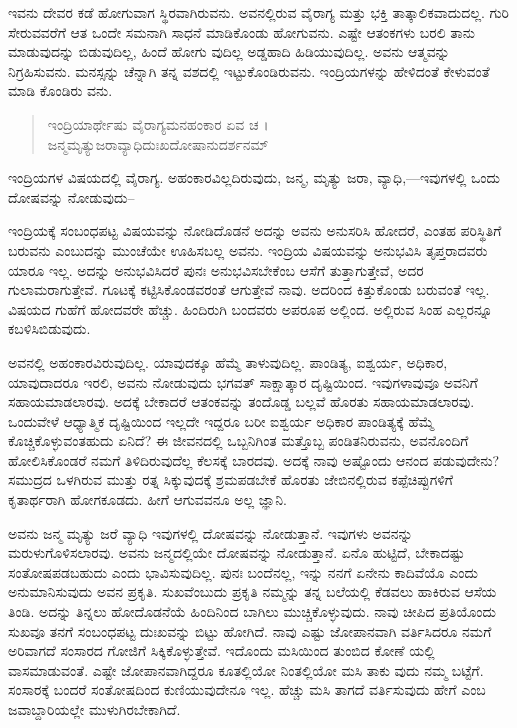 ಇವನು ದೇವರ ಕಡೆ ಹೋಗುವಾಗ ಸ್ಥಿರವಾಗಿರುವನು. ಅವನಲ್ಲಿರುವ ವೈರಾಗ್ಯ ಮತ್ತು ಭಕ್ತಿ ತಾತ್ಕಾಲಿಕವಾದುದಲ್ಲ. ಗುರಿ ಸೇರುವವರೆಗೆ ಆತ ಒಂದೇ ಸಮನಾಗಿ ಸಾಧನೆ ಮಾಡಿಕೊಂಡು ಹೋಗುವನು. ಎಷ್ಟೇ ಆತಂಕಗಳು ಬರಲಿ ತಾನು ಮಾಡುವುದನ್ನು ಬಿಡುವುದಿಲ್ಲ, ಹಿಂದೆ ಹೋಗು ವುದಿಲ್ಲ ಅಡ್ಡಹಾದಿ ಹಿಡಿಯುವುದಿಲ್ಲ. ಅವನು ಆತ್ಮವನ್ನು ನಿಗ್ರಹಿಸುವನು. ಮನಸ್ಸನ್ನು ಚೆನ್ನಾಗಿ ತನ್ನ ವಶದಲ್ಲಿ ಇಟ್ಟುಕೊಂಡಿರುವನು. ಇಂದ್ರಿಯಗಳನ್ನು ಹೇಳಿದಂತೆ ಕೇಳುವಂತೆ ಮಾಡಿ ಕೊಂಡಿರು ವನು.

\begin{verse}
ಇಂದ್ರಿಯಾರ್ಥೇಷು ವೈರಾಗ್ಯಮನಹಂಕಾರ ಏವ ಚ ।\\ಜನ್ಮಮೃತ್ಯುಜರಾವ್ಯಾಧಿದುಃಖದೋಷಾನುದರ್ಶನಮ್ 
\end{verse}

{\small ಇಂದ್ರಿಯಗಳ ವಿಷಯದಲ್ಲಿ ವೈರಾಗ್ಯ. ಅಹಂಕಾರವಿಲ್ಲದಿರುವುದು, ಜನ್ಮ, ಮೃತ್ಯು ಜರಾ, ವ್ಯಾಧಿ,—ಇವುಗಳಲ್ಲಿ ಒಂದು ದೋಷವನ್ನು ನೋಡುವುದು–}

ಇಂದ್ರಿಯಕ್ಕೆ ಸಂಬಂಧಪಟ್ಟ ವಿಷಯವನ್ನು ನೋಡಿದೊಡನೆ ಅದನ್ನು ಅವನು ಅನುಸರಿಸಿ ಹೋದರೆ, ಎಂತಹ ಪರಿಸ್ಥಿತಿಗೆ ಬರುವನು ಎಂಬುದನ್ನು ಮುಂಚೆಯೇ ಊಹಿಸಬಲ್ಲ ಅವನು. ಇಂದ್ರಿಯ ವಿಷಯವನ್ನು ಅನುಭವಿಸಿ ತೃಪ್ತರಾದವರು ಯಾರೂ ಇಲ್ಲ. ಅದನ್ನು ಅನುಭವಿಸಿದರೆ ಪುನಃ ಅನುಭವಿಸಬೇಕೆಂಬ ಆಸೆಗೆ ತುತ್ತಾಗುತ್ತೇವೆ, ಅದರ ಗುಲಾಮರಾಗುತ್ತೇವೆ. ಗೂಟಕ್ಕೆ ಕಟ್ಟಿಸಿಕೊಂಡವರಂತೆ ಆಗುತ್ತೇವೆ ನಾವು. ಅದರಿಂದ ಕಿತ್ತುಕೊಂಡು ಬರುವಂತೆ ಇಲ್ಲ. ವಿಷಯದ ಗುಹೆಗೆ ಹೋದವರೇ ಹೆಚ್ಚು. ಹಿಂದಿರುಗಿ ಬಂದವರು ಅಪರೂಪ ಅಲ್ಲಿಂದ. ಅಲ್ಲಿರುವ ಸಿಂಹ ಎಲ್ಲರನ್ನೂ ಕಬಳಿಸಿಬಿಡುವುದು.

ಅವನಲ್ಲಿ ಅಹಂಕಾರವಿರುವುದಿಲ್ಲ. ಯಾವುದಕ್ಕೂ ಹೆಮ್ಮೆ ತಾಳುವುದಿಲ್ಲ. ಪಾಂಡಿತ್ಯ, ಐಶ್ವರ್ಯ, ಅಧಿಕಾರ, ಯಾವುದಾದರೂ ಇರಲಿ, ಅವನು ನೋಡುವುದು ಭಗವತ್ ಸಾಕ್ಷಾತ್ಕಾರ ದೃಷ್ಟಿಯಿಂದ. ಇವುಗಳಾವುವೂ ಅವನಿಗೆ ಸಹಾಯಮಾಡಲಾರವು. ಅದಕ್ಕೆ ಬೇಕಾದರೆ ಆತಂಕವನ್ನು ತಂದೊಡ್ಡ ಬಲ್ಲವೆ ಹೊರತು ಸಹಾಯಮಾಡಲಾರವು. ಒಂದುವೇಳೆ ಆಧ್ಯಾತ್ಮಿಕ ದೃಷ್ಟಿಯಿಂದ ಇಲ್ಲದೇ ಇದ್ದರೂ ಬರೀ ಐಶ್ವರ್ಯ ಅಧಿಕಾರ ಪಾಂಡಿತ್ಯಕ್ಕೆ ಹೆಮ್ಮೆ ಕೊಚ್ಚಿಕೊಳ್ಳುವಂತಹುದು ಏನಿದೆ? ಈ ಜೀವನದಲ್ಲಿ ಒಬ್ಬನಿಗಿಂತ ಮತ್ತೊಬ್ಬ ಪಂಡಿತನಿರುವನು, ಅವನೊಂದಿಗೆ ಹೋಲಿಸಿಕೊಂಡರೆ ನಮಗೆ ತಿಳಿದಿರುವುದೆಲ್ಲ ಕೆಲಸಕ್ಕೆ ಬಾರದವು. ಅದಕ್ಕೆ ನಾವು ಅಷ್ಟೊಂದು ಆನಂದ ಪಡುವುದೇನು? ಸಮುದ್ರದ ಒಳಗಿರುವ ಮುತ್ತು ರತ್ನ ಸಿಕ್ಕುವುದಕ್ಕೆ ಶ್ರಮಪಡಬೇಕೆ ಹೊರತು ಜೇಬಿನಲ್ಲಿರುವ ಕಪ್ಪೆಚಿಪ್ಪುಗಳಿಗೆ ಕೃತಾರ್ಥರಾಗಿ ಹೋಗಕೂಡದು. ಹೀಗೆ ಆಗುವವನೂ ಅಲ್ಲ ಜ್ಞಾನಿ.

ಅವನು ಜನ್ಮ ಮೃತ್ಯು ಜರೆ ವ್ಯಾಧಿ ಇವುಗಳಲ್ಲಿ ದೋಷವನ್ನು ನೋಡುತ್ತಾನೆ. ಇವುಗಳು ಅವನನ್ನು ಮರುಳುಗೊಳಿಸಲಾರವು. ಅವನು ಜನ್ಮದಲ್ಲಿಯೇ ದೋಷವನ್ನು ನೋಡುತ್ತಾನೆ. ಏನೊ ಹುಟ್ಟಿದೆ, ಬೇಕಾದಷ್ಟು ಸಂತೋಷಪಡಬಹುದು ಎಂದು ಭಾವಿಸುವುದಿಲ್ಲ. ಪುನಃ ಬಂದೆನಲ್ಲ, ಇನ್ನು ನನಗೆ ಏನೇನು ಕಾದಿವೆಯೊ ಎಂದು ಅನುಮಾನಿಸುವುದು ಅವನ ಪ್ರಕೃತಿ. ಸುಖವೆಂಬುದು ಪ್ರಕೃತಿ ನಮ್ಮನ್ನು ತನ್ನ ಬಲೆಯಲ್ಲಿ ಕೆಡವಲು ಹಾಕಿರುವ ಆಸೆಯ ತಿಂಡಿ. ಅದನ್ನು ತಿನ್ನಲು ಹೋದೊಡನೆಯೆ ಹಿಂದಿನಿಂದ ಬಾಗಿಲು ಮುಚ್ಚಿಕೊಳ್ಳುವುದು. ನಾವು ಚೀಪಿದ ಪ್ರತಿಯೊಂದು ಸುಖವೂ ತನಗೆ ಸಂಬಂಧಪಟ್ಟ ದುಃಖವನ್ನು ಬಿಟ್ಟು ಹೋಗಿದೆ. ನಾವು ಎಷ್ಟು ಜೋಪಾನವಾಗಿ ವರ್ತಿಸಿದರೂ ನಮಗೆ ಅರಿವಾಗದೆ ಸಂಸಾರದ ಗೋಜಿಗೆ ಸಿಕ್ಕಿಕೊಳ್ಳುತ್ತೇವೆ. ಇದೊಂದು ಮಸಿಯಿಂದ ತುಂಬಿದ ಕೋಣೆ ಯಲ್ಲಿ ವಾಸಮಾಡುವಂತೆ. ಎಷ್ಟೇ ಜೋಪಾನವಾಗಿದ್ದರೂ ಕೂತಲ್ಲಿಯೋ ನಿಂತಲ್ಲಿಯೋ ಮಸಿ ತಾಕು ವುದು ನಮ್ಮ ಬಟ್ಟೆಗೆ. ಸಂಸಾರಕ್ಕೆ ಬಂದರೆ ಸಂತೋಷದಿಂದ ಕುಣಿಯುವುದೇನೂ ಇಲ್ಲ. ಹೆಚ್ಚು ಮಸಿ ತಾಗದೆ ವರ್ತಿಸುವುದು ಹೇಗೆ ಎಂಬ ಜವಾಬ್ದಾರಿಯಲ್ಲೇ ಮುಳುಗಿರಬೇಕಾಗಿದೆ.

